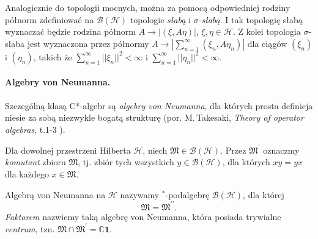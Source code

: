 Analogicznie do topologii mocnych, można za pomocą odpowiedniej rodziny
półnorm
zdefiniować na $\mathcal{B}(\mathcal{H})$ topologie \emph{słabą} i \emph{$\sigma$-słabą}.
I tak topologię słabą
wyznaczać będzie rodzina półnorm $A \rightarrow |(\xi, A \eta)|$,
$\xi, \eta
\in \mathcal{H}$. Z kolei topologia $\sigma$-słaba jest wyznaczona
przez półnormy
$A \rightarrow \left| \sum \limits_{n=1}^{\infty} (\xi_{n}, A
\eta_{n})
\right|$ dla ciągów $(\xi_{n})$ i $(\eta_{n})$, takich że
$\sum \limits_{n=1}^{\infty} ||\xi_{n}||^{2} < \infty$ i
$\sum \limits_{n=1}^{\infty} ||\eta_{n}||^{2} < \infty$.

\paragraph{Algebry von Neumanna.}
Szczególną klasą C*-algebr są \emph{algebry von Neumanna},
dla których prosta definicja niesie za sobą niezwykle bogatą strukturę
(por. M.\,Takesaki, \emph{Theory of operator algebras}, t.1-3
\cite{Takesaki1, Takesaki2, Takesaki3}).

Dla dowolnej przestrzeni Hilberta $\mathcal{H}$,
niech $\mathfrak{M} \in \mathcal{B}(\mathcal{H})$.
Przez $\mathfrak{M}^{\prime}$ oznaczmy \emph{komutant} zbioru $\mathfrak{M}$,
tj. zbiór tych wszystkich $y \in \mathcal{B}(\mathcal{H})$,
dla których $x y = y x$ dla każdego $x \in \mathfrak{M}$.

\begin{Definition}
    \label{def:vNalgebras}
    Algebrą von Neumanna na $\mathcal{H}$ nazywamy $^{*}$-podalgebrę
    $\mathcal{B}(\mathcal{H})$, dla której
    \begin{equation}
        \mathfrak{M} = \mathfrak{M}^{\prime \prime}.
    \end{equation}
    \emph{Faktorem} nazwiemy taką algebrę von Neumanna, która posiada
    trywialne \emph{centrum}, tzn.
    $\mathfrak{M} \cap \mathfrak{M}^{\prime} = \mathbb{C} \mathbf{1}$.
\end{Definition}

